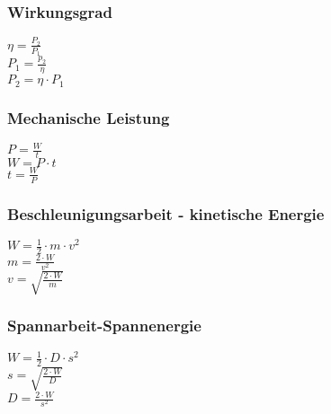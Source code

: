 \subsubsection{Wirkungsgrad} 
\begin{minipage}{0.45\textwidth} 
$ \eta  = \frac{P_{2} }{P_{1} } $\\ 
$ P_{1}  = \frac{p_{2} }{\eta } $\\ 
$ P_{2}  = \eta \cdot P_{1} $\\ 
\end{minipage} 
\begin{minipage}{0.45\textwidth} 
 
\end{minipage} 
\subsubsection{Mechanische Leistung} 
\begin{minipage}{0.45\textwidth} 
$ P = \frac{W}{t} $\\ 
$ W = P\cdot t $\\ 
$ t = \frac{W}{P} $\\ 
\end{minipage} 
\begin{minipage}{0.45\textwidth} 
 
\end{minipage} 
\subsubsection{Beschleunigungsarbeit - kinetische Energie} 
\begin{minipage}{0.45\textwidth} 
$ W = \frac{1}{2}\cdot m\cdot v^{2} $\\ 
$ m = \frac{2\cdot W}{ v^{2} } $\\ 
$ v = \sqrt{\frac{2\cdot W}{ m}} $\\ 
\end{minipage} 
\begin{minipage}{0.45\textwidth} 
 
\end{minipage} 
\subsubsection{Spannarbeit-Spannenergie} 
\begin{minipage}{0.45\textwidth} 
$ W =\frac{1}{2}\cdot D\cdot s^{2} $\\ 
$ s = \sqrt{\frac{2\cdot W}{ D}} $\\ 
$ D =\frac{2\cdot W}{s^{2} } $\\ 
\end{minipage} 
\begin{minipage}{0.45\textwidth} 
 
\end{minipage} 
